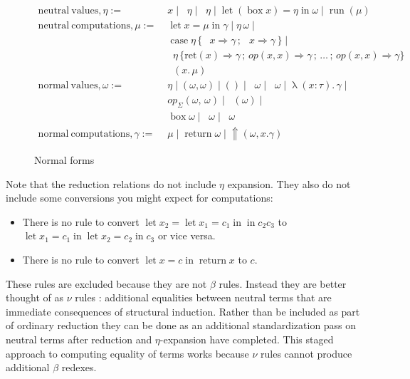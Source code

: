 \documentclass[acmsmall, screen, nonacm]{acmart}
\theoremstyle{definition}
\newcommand{\reflectname}{\Uparrow}
\newcommand{\performraw}[2]{\mathop{\reflectname(#1(#2))}}
\newcommand{\perform}[5]{\performraw{#1}{#2}(#3, #4. #5)}
\newcommand{\reifyname}{\Downarrow}
\newcommand{\reifyraw}[1]{\mathop{\reifyname_{#1}}}
\newcommand{\reify}[3]{\reifyraw{#1}(#2.\,#3)}
\newcommand{\outl}[1]{\mathop{\mathrm{out}_L} #1}
\newcommand{\outr}[1]{\mathop{\mathrm{out}_R} #1}
\newcommand{\indintro}[4]{#2_{#1}(#3,\, #4)}
\newcommand{\retname}{\mathrm{ret}}
\newcommand{\ret}[2]{\mathop{\retname_{#1}}(#2)}
\newcommand{\indelim}[3]{\mathop{\mathrm{rec}_{#1}} #2 \,\{#3\}}
\newcommand{\indretcase}[2]{\retname(#1) \Rightarrow #2}
\newcommand{\indcase}[4]{#1(#2, #3) \Rightarrow #4}
\newcommand{\seq}{\,;\,}
\newcommand{\fst}{\mathop{\pi_1}}
\newcommand{\snd}{\mathop{\pi_2}}
\newcommand{\inl}[1]{\mathop{\mathrm{in}_L} #1}
\newcommand{\inr}[1]{\mathop{\mathrm{in}_R} #1}
\newcommand{\case}[5]{\mathop{\mathrm{case}} #1 \,\{\,\inl{#2} \Rightarrow #3 \seq \inr{#4} \Rightarrow #5 \,\}}
\newcommand{\abs}[3]{\mathop{\lambda}(#1 \types #2).\,#3}
\newcommand{\app}[2]{#1\,#2}
\newcommand{\types}{\mathrel{:}}
\newcommand{\return}[1]{\mathop{\mathrm{return}} #1}
\newcommand{\letv}[3]{\mathop{\mathrm{let}} #1 = #2 \mathop{\mathrm{in}} #3}
\newcommand{\gbox}[1]{\mathop{\mathrm{box}} #1}
\newcommand{\gunbox}[3]{\mathop{\mathrm{let}} (\gbox #1) = #2 \mathop{\mathrm{in}} #3}
\newcommand{\grun}[1]{\mathop{\mathrm{run}}(#1)}
\begin{document}
\begin{figure}
\begin{align*}
  \mathrm{neutral\ values}, \eta :=\;& x \mid \fst \eta \mid \snd \eta
                                     \mid \gunbox{x}{\eta}{\omega} \mid \grun{\mu} \\
  \mathrm{neutral\ computations}, \mu :=\;& \letv{x}{\mu}{\gamma}
                                           \mid \app{\eta}{\omega} \mid \\
                                   & \case{\eta}{x}{\gamma}{x}{\gamma} \mid \\
                            & \indelim{\Sigma}{\eta}
                              {\indretcase{x}{\gamma} \seq
                               \indcase{op}{x}{x}{\gamma} \seq \ldots \seq
                               \indcase{op}{x}{x}{\gamma}} \\
                                   & \reify{\Sigma}{x}{\mu} \\
  \mathrm{normal\ values}, \omega :=\;& \eta \mid (\omega, \omega)
                           \mid () \mid \inl{\omega} \mid \inr{\omega} \mid \abs{x}{\tau}{\gamma} \mid \\
                           &\indintro{\Sigma}{op}{\omega}{\omega} \mid \ret{\Sigma}{\omega} \mid \\
                           &\gbox{\omega} \mid \outl{\omega} \mid \outr{\omega} \\
  \mathrm{normal\ computations}, \gamma :=\;& \mu \mid \return{\omega}
                                               \mid \perform{\eta}{op}{\omega}{x}{\gamma}
\end{align*}
\caption{Normal forms}
\label{fig:normal}
\end{figure}

Note that the reduction relations do not include $\eta$ expansion. They
also do not include some conversions you might expect for computations:
\begin{itemize}
\item There is no rule to convert
  $\letv{x_2}{\letv{x_1}{c_1}}{c_2}{c_3}$ to
  $\letv{x_1}{c_1}{\letv{x_2}{c_2}{c_3}}$ or vice versa.
\item There is no rule to convert $\letv{x}{c}{\return x}$ to $c$.
\end{itemize}
These rules are excluded because they are not $\beta$ rules. Instead
they are better thought of as $\nu$ rules \cite{??}: additional
equalities between neutral terms that are immediate consequences of
structural induction. Rather than be included as part of ordinary
reduction they can be done as an additional standardization pass on
neutral terms after reduction and $\eta$-expansion have completed. This
staged approach to computing equality of terms works because $\nu$ rules
cannot produce additional $\beta$ redexes.
\end{document}
